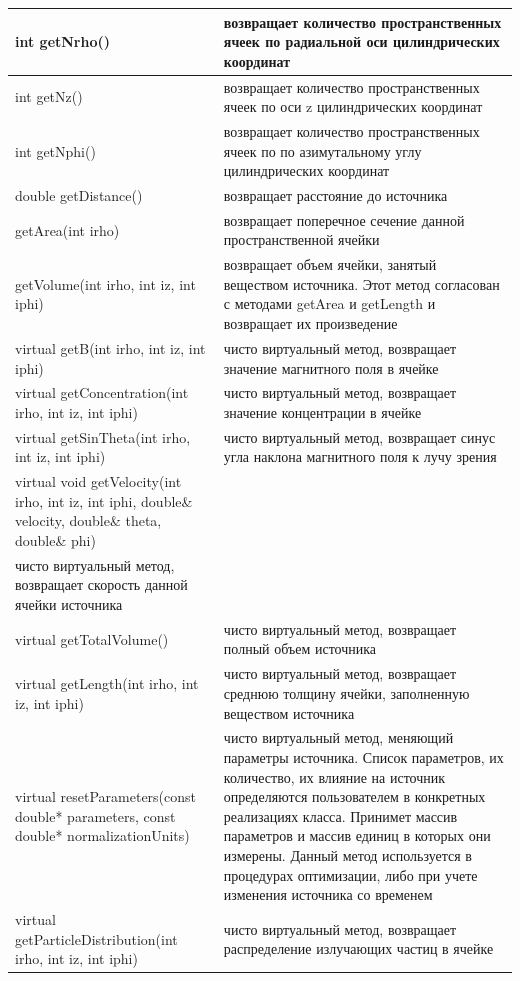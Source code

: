 \begin{small}
\begin{xtabular}{|p{0.5\textwidth}|p{0.5\textwidth}|}
		\hline
		int getNrho() & возвращает количество пространственных ячеек по радиальной оси цилиндрических координат\\
		\hline
		int getNz() & возвращает количество пространственных ячеек по оси z цилиндрических координат\\
		\hline
		int getNphi() & возвращает количество пространственных ячеек по по азимутальному углу цилиндрических координат\\
		\hline
		double getDistance() & возвращает расстояние до источника\\
		\hline
		getArea(int irho) & возвращает поперечное сечение данной пространственной ячейки\\
		\hline
		getVolume(int irho, int iz, int iphi) & возвращает объем ячейки, занятый веществом источника. Этот метод согласован с методами getArea и getLength и возвращает их произведение\\
		\hline
		virtual getB(int irho, int iz, int iphi) & чисто виртуальный метод, возвращает значение магнитного поля в ячейке\\
		\hline
		virtual getConcentration(int irho, int iz, int iphi) & чисто виртуальный метод, возвращает значение концентрации в ячейке \\
		\hline
		virtual getSinTheta(int irho, int iz, int iphi) & чисто виртуальный метод, возвращает синус угла наклона магнитного поля к лучу зрения\\
		\hline
		virtual void getVelocity(int irho, int iz, int iphi, double\& velocity, double\& theta, double\& phi) &\\
		чисто виртуальный метод, возвращает скорость данной ячейки источника\\
		\hline
		virtual getTotalVolume() & чисто виртуальный метод, возвращает полный объем источника\\
		\hline
		virtual getLength(int irho, int iz, int iphi) & чисто виртуальный метод, возвращает среднюю толщину ячейки, заполненную веществом источника\\
		\hline
		virtual resetParameters(const double* parameters, const double* normalizationUnits) & чисто виртуальный метод, меняющий параметры источника. Список параметров, их количество, их влияние на источник определяются пользователем в конкретных реализациях класса. Принимет массив параметров и массив единиц в которых они измерены. Данный метод используется в процедурах оптимизации, либо при учете изменения источника со временем\\
		\hline
		virtual getParticleDistribution(int irho, int iz, int iphi) & чисто виртуальный метод, возвращает распределение излучающих частиц в ячейке\\

\end{xtabular}
\end{small}
